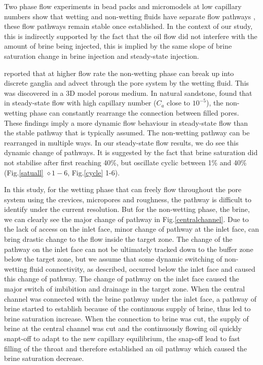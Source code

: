 Two phase flow experiments in bead packs and micromodels at low capillary numbers show that wetting and non-wetting fluids have separate flow pathways \citep{lenormand1983mechanisms, chatenever1952visual}, these flow pathways remain stable once established. In the context of our study, this is indirectly supported by the fact that the oil flow did not interfere with the amount of brine being injected, this is implied by the same slope of brine saturation change in brine injection and steady-state injection.

\citet{datta2014fluid} reported that at higher flow rate the non-wetting phase can break up into discrete ganglia and advect through the pore system by the wetting fluid. This was discovered in a 3D model porous medium. In natural sandstone, \citet{reynolds2017dynamic} found that in steady-state flow with high capillary number ($C_a$ close to $10^{-5}$), the non-wetting phase can constantly rearrange the connection between filled pores. These findings imply a more dynamic flow behaviour in steady-state flow than the stable pathway that is typically assumed. The non-wetting pathway can be rearranged in multiple ways. In our steady-state flow results, we do see this dynamic change of pathways. It is suggested by the fact that brine saturation did not stabilise after first reaching 40\%, but oscillate cyclic between 1\% and 40\% (Fig.\ref{satuall} $\diamond1-6$, Fig.\ref{cycle} 1-6). 

In this study, for the wetting phase that can freely flow throughout the pore system using the crevices, micropores and roughness, the pathway is difficult to identify under the current resolution. But for the non-wetting phase, the brine, we can clearly see the major change of pathway in Fig.\ref{centralchannel}. Due to the lack of access on the inlet face, minor change of pathway at the inlet face, can bring drastic change to the flow inside the target zone. The change of the pathway on the inlet face can not be ultimately tracked down to the buffer zone below the target zone, but we assume that some dynamic switching of non-wetting fluid connectivity, as \citet{reynolds2017dynamic} described, occurred below the inlet face and caused this change of pathway. The change of pathway on the inlet face caused the major switch of imbibition and drainage in the target zone. When the central channel was connected with the brine pathway under the inlet face, a pathway of brine started to establish because of the continuous supply of brine, thus led to brine saturation increase. When the connection to brine was cut, the supply of brine at the central channel was cut and the continuously flowing oil quickly snapt-off to adapt to the new capillary equilibrium, the snap-off lead to fast filling of the throat and therefore established an oil pathway which caused the brine saturation decrease.

